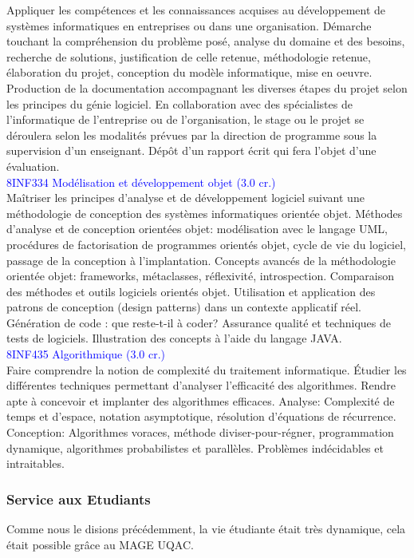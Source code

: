 Appliquer les compétences et les connaissances acquises au développement de systèmes
informatiques en entreprises ou dans une organisation.
Démarche touchant la compréhension du problème posé, analyse du domaine et des besoins,
recherche de solutions, justification de celle retenue, méthodologie retenue, élaboration du
projet, conception du modèle informatique, mise en oeuvre. Production de la documentation
accompagnant les diverses étapes du projet selon les principes du génie logiciel. En
collaboration avec des spécialistes de l'informatique de l'entreprise ou de l'organisation, le
stage ou le projet se déroulera selon les modalités prévues par la direction de programme
sous la supervision d'un enseignant. Dépôt d'un rapport écrit qui fera l'objet d'une évaluation.\\

\textcolor{blue}{8INF334 Modélisation et développement objet (3.0 cr.)}\\

Maîtriser les principes d'analyse et de développement logiciel suivant une méthodologie de
conception des systèmes informatiques orientée objet.
Méthodes d'analyse et de conception orientées objet: modélisation avec le langage UML,
procédures de factorisation de programmes orientés objet, cycle de vie du logiciel, passage de
la conception à l'implantation. Concepts avancés de la méthodologie orientée objet:
frameworks, métaclasses, réflexivité, introspection. Comparaison des méthodes et outils
logiciels orientés objet. Utilisation et application des patrons de conception (design patterns)
dans un contexte applicatif réel. Génération de code : que reste-t-il à coder? Assurance qualité
et techniques de tests de logiciels. Illustration des concepts à l'aide du langage JAVA.\\

\textcolor{blue}{8INF435 Algorithmique (3.0 cr.)}\\

Faire comprendre la notion de complexité du traitement informatique. Étudier les différentes
techniques permettant d'analyser l'efficacité des algorithmes. Rendre apte à concevoir et
implanter des algorithmes efficaces.
Analyse: Complexité de temps et d'espace, notation asymptotique, résolution d'équations de
récurrence. Conception: Algorithmes voraces, méthode diviser-pour-régner, programmation
dynamique, algorithmes probabilistes et parallèles. Problèmes indécidables et intraitables.


\subsubsection{Service aux Etudiants}
Comme nous le disions précédemment, la vie étudiante était très dynamique, cela était possible grâce au MAGE UQAC.\\

